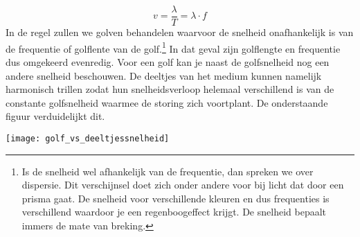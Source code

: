 \documentclass{ximera}
\begin{document}
	\begin{equation*}
	v=\frac{\lambda}{T}=\lambda\cdot f
	\end{equation*}
	In de regel zullen we golven behandelen waarvoor de snelheid onafhankelijk is van de frequentie of golflente van de golf.\footnote{Is de snelheid wel afhankelijk van de frequentie, dan spreken we over dispersie. Dit verschijnsel doet zich onder andere voor bij licht dat door een prisma gaat. De snelheid voor verschillende kleuren en dus frequenties is verschillend waardoor je een regenboogeffect krijgt. De snelheid bepaalt immers de mate van breking.} In dat geval zijn golflengte en frequentie dus omgekeerd evenredig.
	Voor een golf kan je naast de golfsnelheid nog een andere snelheid beschouwen. De deeltjes van het medium kunnen namelijk harmonisch trillen zodat hun snelheidsverloop helemaal verschillend is van de constante golfsnelheid waarmee de storing zich voortplant. De onderstaande figuur verduidelijkt dit.
	\begin{image}
	
	\texttt{[image: golf\_vs\_deeltjessnelheid]}
	\end{image}
	
\end{document}

